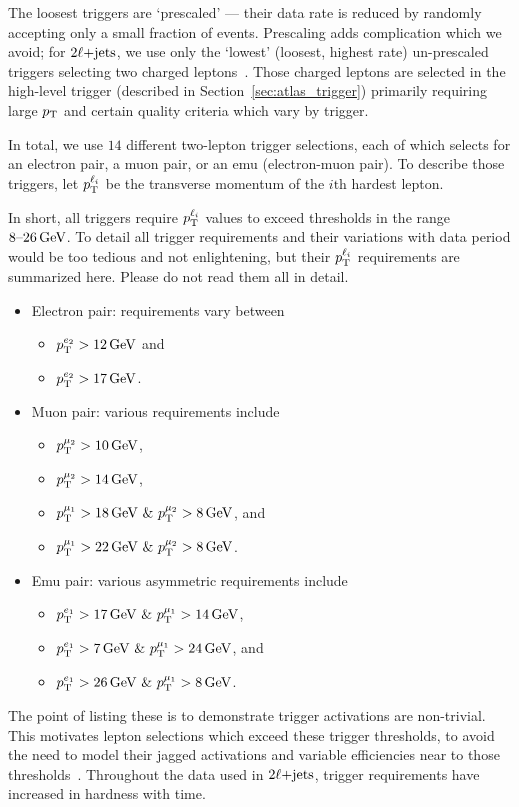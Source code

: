 The loosest triggers are `prescaled' --- their data rate is reduced by randomly
accepting only a small fraction of events.
Prescaling adds complication which we avoid;
for $\twoljets$, we use only the `lowest' (loosest, highest rate) un-prescaled
triggers selecting two charged leptons~\cite{atlas_twiki_lowest_unprescaled}.
Those charged leptons are selected in the
high-level trigger (described in Section~\ref{sec:atlas_trigger})
primarily requiring large $\pt$ and certain quality criteria which vary by
trigger.

In total, we use $14$ different two-lepton trigger selections, each of which
selects for an electron pair, a muon pair, or an emu (electron-muon pair).
To describe those triggers, let $\pt^{\ell_i}$ be the transverse momentum of the
$i\mathrm{th}$ hardest lepton.

In short, all triggers require $\pt^{\ell_i}$ values to exceed thresholds in
the range $8\textrm{--}26\,\eV[G]$.
To detail all trigger requirements and their variations with data period
would be too tedious and not enlightening, but their $\pt^{\ell_i}$ requirements
are summarized here.
Please do not read them all in detail.
\begin{itemize}
\item Electron pair: requirements vary between
\begin{itemize}
\item $\pt^{e_2} > 12\,\eV[G]$ and
\item $\pt^{e_2} > 17\,\eV[G]$.
\end{itemize}
\item Muon pair: various requirements include
\begin{itemize}
\item $\pt^{\mu_2} > 10\,\eV[G]$,
\item $\pt^{\mu_2} > 14\,\eV[G]$,
\item $\pt^{\mu_1} > 18\,\eV[G]~\&~\pt^{\mu_2} > 8\,\eV[G]$, and
\item $\pt^{\mu_1} > 22\,\eV[G]~\&~\pt^{\mu_2} > 8\,\eV[G]$.
\end{itemize}
\item Emu pair: various asymmetric requirements include
\begin{itemize}
\item $\pt^{e_1} > 17\,\eV[G]~\&~\pt^{\mu_1} > 14\,\eV[G]$,
\item $\pt^{e_1} > 7\,\eV[G]~\&~\pt^{\mu_1} > 24\,\eV[G]$, and
\item $\pt^{e_1} > 26\,\eV[G]~\&~\pt^{\mu_1} > 8\,\eV[G]$.
\end{itemize}
\end{itemize}
The point of listing these is to demonstrate trigger activations are
non-trivial.
This motivates lepton selections which exceed these trigger thresholds,
to avoid the need to model their jagged activations and variable
efficiencies near to those thresholds~\cite{
atlas_trigger_egamma_run2,
atlas_trigger_muon_run2
}.
Throughout the data used in $\twoljets$, trigger requirements
have increased in hardness with time.


